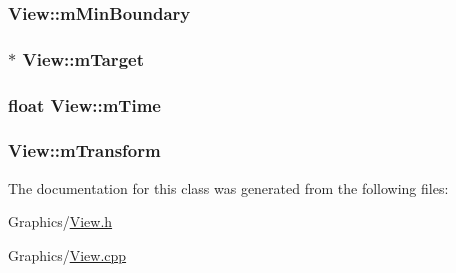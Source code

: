\subsubsection[{\texorpdfstring{m\+Min\+Boundary}{mMinBoundary}}]{ View\+::m\+Min\+Boundary\hspace{0.3cm}{\ttfamily [private]}}\hypertarget{classView_a3581943c539feca7e21be9990cbe9de0}{}\label{classView_a3581943c539feca7e21be9990cbe9de0}
\subsubsection[{\texorpdfstring{m\+Target}{mTarget}}]{$\ast$ View\+::m\+Target\hspace{0.3cm}{\ttfamily [private]}}\hypertarget{classView_a7c296061a47055cda78fcf06550d71ce}{}\label{classView_a7c296061a47055cda78fcf06550d71ce}
\subsubsection[{\texorpdfstring{m\+Time}{mTime}}]{\setlength{\rightskip}{0pt plus 5cm}float View\+::m\+Time\hspace{0.3cm}{\ttfamily [private]}}\hypertarget{classView_ac9f619992f8bbfcc829ec316bde2ca8f}{}\label{classView_ac9f619992f8bbfcc829ec316bde2ca8f}
\subsubsection[{\texorpdfstring{m\+Transform}{mTransform}}]{ View\+::m\+Transform\hspace{0.3cm}{\ttfamily [private]}}\hypertarget{classView_a0d6ae028e18a181c998c8f04be9b8b4f}{}\label{classView_a0d6ae028e18a181c998c8f04be9b8b4f}


The documentation for this class was generated from the following files\+:\begin{DoxyCompactItemize}
\item 
Graphics/\hyperlink{View_8h}{View.\+h}\item 
Graphics/\hyperlink{View_8cpp}{View.\+cpp}\end{DoxyCompactItemize}
